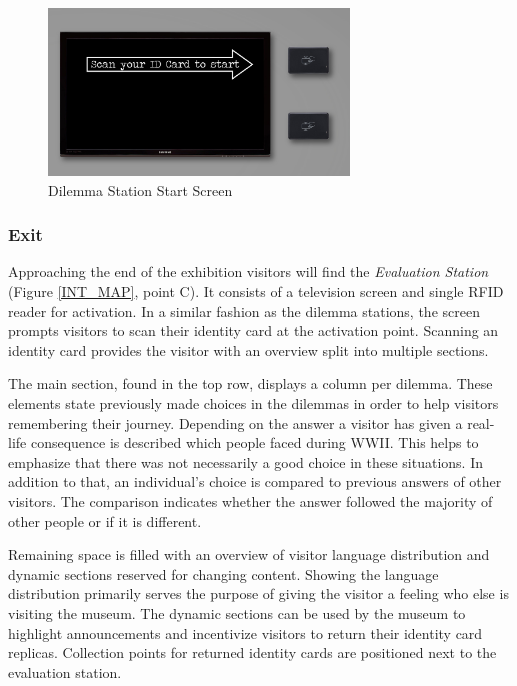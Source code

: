 \begin{figure} [H]
\includegraphics[width=8cm]{assets/scan_start.jpg}
\caption{Dilemma Station Start Screen}
\centering
\label{SCAN_START}
\end{figure}

\subsubsection{Exit}
Approaching the end of the exhibition visitors will find the \textit{Evaluation Station} (Figure \ref{INT_MAP}, point C).
It consists of a television screen and single RFID reader for activation.
In a similar fashion as the dilemma stations, the screen prompts visitors to scan their identity card at the activation point.
Scanning an identity card provides the visitor with an overview split into multiple sections.

The main section, found in the top row, displays a column per dilemma.
These elements state previously made choices in the dilemmas in order to help visitors remembering their journey.
Depending on the answer a visitor has given a real-life consequence is described which people faced during WWII.
This helps to emphasize that there was not necessarily a good choice in these situations.
In addition to that, an individual's choice is compared to previous answers of other visitors.
The comparison indicates whether the answer followed the majority of other people or if it is different.

Remaining space is filled with an overview of visitor language distribution and dynamic sections reserved for changing content.
Showing the language distribution primarily serves the purpose of giving the visitor a feeling who else is visiting the museum.
The dynamic sections can be used by the museum to highlight announcements and incentivize visitors to return their identity card replicas.
Collection points for returned identity cards are positioned next to the evaluation station.

